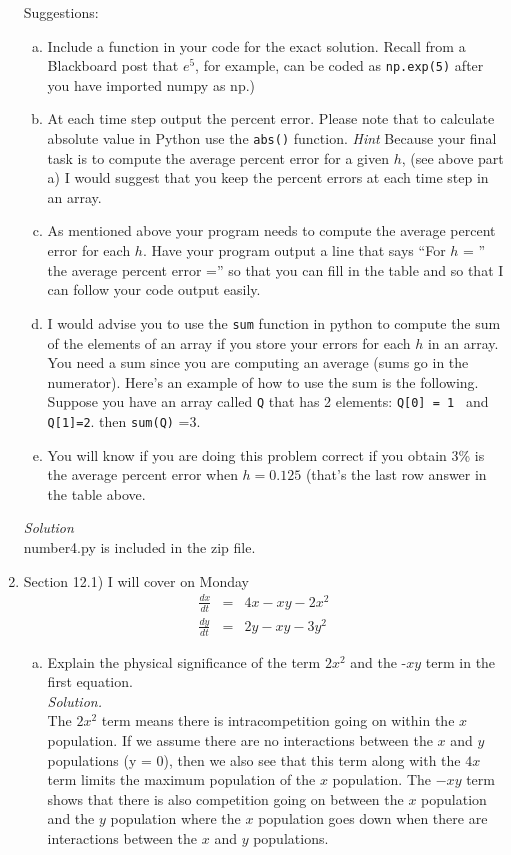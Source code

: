 \documentclass[12pt,letterpaper]{article}
\begin{document}
\begin{enumerate}
 
 
Suggestions:
 
 
\begin{enumerate}[a)]

\item Include a function in your code for the exact solution. Recall from a Blackboard post that $e^{5}$, for example, can be coded as 
{\tt np.exp(5)} after you have imported numpy as np.)

\item  At each time step output the percent error. Please note that  to calculate absolute value in Python use the {\tt abs()} function.  \emph{Hint} Because your  final task is to compute the average percent error for a given $h$, (see above part a)  I would suggest that you keep the percent errors at each time step in an array.


\item As mentioned above your program  needs to compute the average percent error for each $h$.  Have your program output a line that says ``For $h$ = ''   the average percent error ='' so that you can fill in the table and so that I can follow your code output easily.


\item I would advise you to use the {\tt sum} function in python to compute the sum of the elements of an array if you store your errors for each $h$ in an array. You need a sum since you are computing an average (sums go in the numerator). Here's an example of how to use the sum is the following. Suppose you have an array called 
{\tt Q} that has 2 elements: {\tt Q[0] = 1 } and {\tt Q[1]=2}. then {\tt sum(Q)} =3.

\item You will know if you are doing this problem correct if you obtain 3\% is the average percent error when $h=0.125$ (that's the last row answer in the table above.

\end{enumerate}

\emph{Solution}\\
number4.py is included in the zip file.

\newpage
\item Section 12.1)  I will cover on Monday
 \begin{eqnarray*}
 \frac{dx}{dt} &=& 4x-xy-2x^2\\
 \frac{dy}{dt} &=& 2y-xy-3y^2
\end{eqnarray*} 
\begin{enumerate}[a)]
\item Explain the physical significance of the term $2x^2$ and the -$xy$ term in the first equation.
\\\emph{Solution.} \\
The $2x^2$ term means there is intracompetition going on within the $x$ population. If we 
assume there are no interactions between the $x$ and $y$ populations (y = 0), then we 
also see that this term along with the $4x$ term limits the maximum population of the 
$x$ population. The $-xy$ term shows that there is also competition going on between 
the $x$ population and the $y$ population where the $x$ population goes down 
when there are interactions between the $x$ and $y$ populations.


\end{enumerate}
\end{enumerate}
\end{document}
